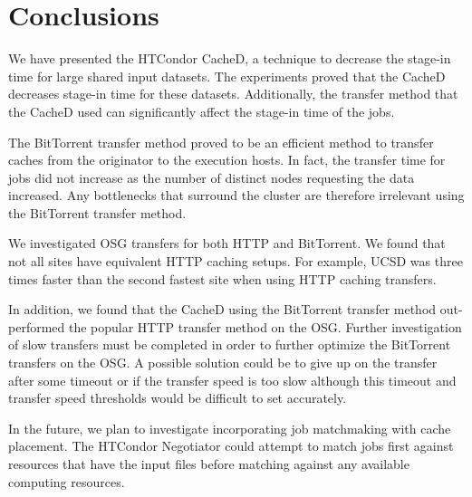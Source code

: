 \section{Conclusions}
We have presented the HTCondor CacheD, a technique to decrease the stage-in time for large shared input datasets.  The experiments proved that the CacheD decreases stage-in time for these datasets.  Additionally, the transfer method that the CacheD used can significantly affect the stage-in time of the jobs.

The BitTorrent transfer method proved to be an efficient method to transfer caches from the originator to the execution hosts.  In fact, the transfer time for jobs did not increase as the number of distinct nodes requesting the data increased.  Any bottlenecks that surround the cluster are therefore irrelevant using the BitTorrent transfer method.

We investigated OSG transfers for both HTTP and BitTorrent.  We found that not all sites have equivalent HTTP caching setups.  For example, UCSD was three times faster than the second fastest site when using HTTP caching transfers.

In addition, we found that the CacheD using the BitTorrent transfer method out-performed the popular HTTP transfer method on the OSG.  Further investigation of slow transfers must be completed in order to further optimize the BitTorrent transfers on the OSG.  A possible solution could be to give up on the transfer after some timeout or if the transfer speed is too slow although this timeout and transfer speed thresholds would be difficult to set accurately.


In the future, we plan to investigate incorporating job matchmaking with cache placement.  The HTCondor Negotiator could attempt to match jobs first against resources that have the input files before matching against any available computing resources.




